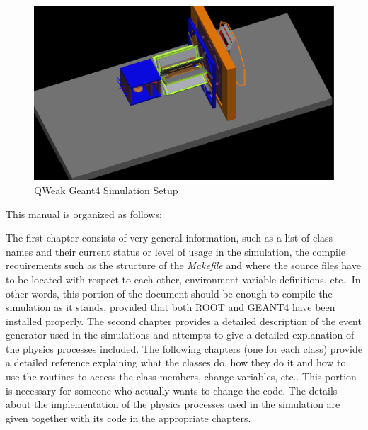 \begin{landscape}
\begin{figure}[h]
  \hspace{0cm}
  \includegraphics[scale=0.5]{./Introduction/figures/QWeakGeant4.eps}
  \caption{QWeak Geant4 Simulation Setup}
           \label{fig:INTRO-1}
\end{figure}
\end{landscape}

\clearpage

This manual is organized as follows: 

The first chapter consists of very general information, such as a list
of class names and their current status or level of usage in the
simulation, the compile requirements such as the structure of the {\em
Makefile} and where the source files have to be located with respect
to each other, environment variable definitions, etc.. In other words,
this portion of the document should be enough to compile the
simulation as it stands, provided that both ROOT and GEANT4 have been
installed properly. The second chapter provides a detailed description
of the event generator used in the simulations and attempts to give a
detailed explanation of the physics processes included.  The following
chapters (one for each class) provide a detailed reference explaining
what the classes do, how they do it and how to use the routines to
access the class members, change variables, etc.. This portion is
necessary for someone who actually wants to change the code. The
details about the implementation of the physics processes used in the
simulation are given together with its code in the appropriate
chapters.

